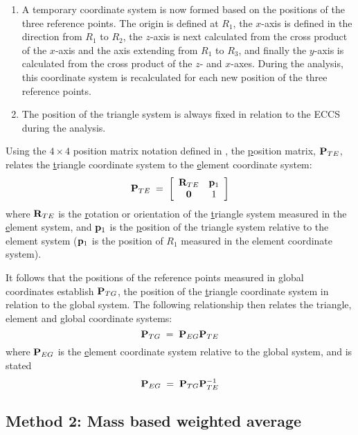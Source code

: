 \begin{enumerate}
%
\item A temporary coordinate system is now formed based on the positions
of the three reference points.
The origin is defined at $R_1$,
the $x$-axis is defined in the direction from $R_1$ to $R_2$,
the $z$-axis is next calculated from the cross product of the $x$-axis and the
axis extending from $R_1$ to $R_3$, and finally the $y$-axis is calculated from
the cross product of the $z$- and $x$-axes.
During the analysis, this coordinate system is recalculated for each new
position of the three reference points.
%
\item The position of the triangle system is always fixed in relation to the
ECCS during the analysis.
\end{enumerate}

\clearpage
Using the $4\times4$ position matrix notation defined in , the
{\underline p}osition matrix, ${\mf P}_{TE}$, relates the {\underline t}riangle
coordinate system to the {\underline e}lement coordinate system:
%
\begin{equation}
{\mf P}_{TE} \;=\; \left[\barr{cc}
{\mf R}_{TE} & {\mf p}_1 \\
{\mf 0} & 1 \earr\right]
\end{equation}
%
where ${\mf R}_{TE}$ is the {\underline r}otation or orientation of the
{\underline t}riangle system measured in the {\underline e}lement system,
and ${\mf p}_1$ is the {\underline p}osition of the triangle system relative
to the element system (${\mf p}_1$ is the position of $R_1$ measured in the
element coordinate system).

It follows that the positions of the reference points measured in global
coordinates establish ${\mf P}_{TG}$, the position of the {\underline t}riangle
coordinate system in relation to the {\underline g}lobal system.
The following relationship then relates the triangle,
element and global coordinate systems:
%
\begin{equation}
{\mf P}_{TG} \;=\; {\mf P}_{EG}{\mf P}_{TE}
\end{equation}
%
where ${\mf P}_{EG}$ is the {\underline e}lement coordinate system relative to
the {\underline g}lobal system, and is stated
%
\begin{equation}
{\mf P}_{EG} \;=\; {\mf P}_{TG}{\mf P}_{TE}^{-1}
\end{equation}

\subsection{Method 2: Mass based weighted average}
\label{sec:RefDefMeth2}

